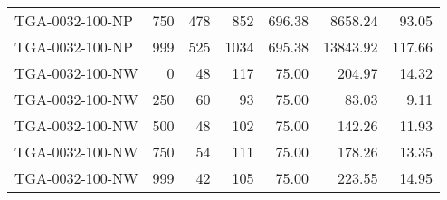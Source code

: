 \begin{table}[htbp]
{\begin{tabular}{lrrrrrr}
    TGA-0032-100-NP & 750    & 478    & 852    & 696.38 & 8658.24 & 93.05 \\
    TGA-0032-100-NP & 999    & 525    & 1034   & 695.38 & 13843.92 & 117.66 \\ \hline
    TGA-0032-100-NW & 0      & 48     & 117    & 75.00  & 204.97 & 14.32 \\
    TGA-0032-100-NW & 250    & 60     & 93     & 75.00  & 83.03  & 9.11 \\
    TGA-0032-100-NW & 500    & 48     & 102    & 75.00  & 142.26 & 11.93 \\
    TGA-0032-100-NW & 750    & 54     & 111    & 75.00  & 178.26 & 13.35 \\
    TGA-0032-100-NW & 999    & 42     & 105    & 75.00  & 223.55 & 14.95 \\
    \bottomrule
    \end{tabular}}
  \label{tab:addlabel}%
\end{table}%

